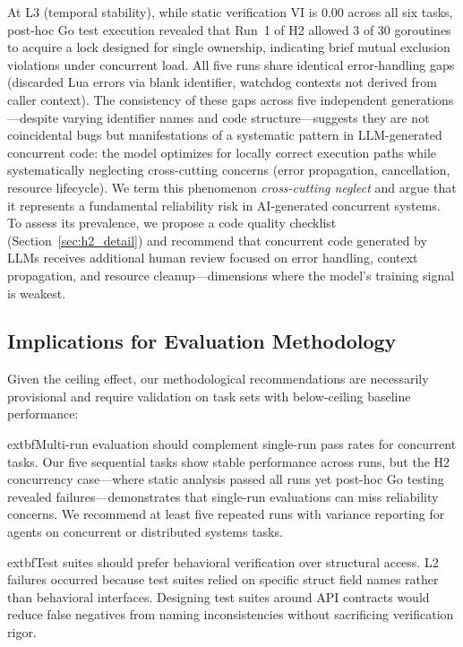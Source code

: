 \documentclass[conference]{IEEEtran}
\begin{document}
At L3 (temporal stability), while static verification VI is 0.00 across all six tasks, post-hoc Go test execution revealed that Run~1 of H2 allowed 3 of 30 goroutines to acquire a lock designed for single ownership, indicating brief mutual exclusion violations under concurrent load. All five runs share identical error-handling gaps (discarded Lua errors via blank identifier, watchdog contexts not derived from caller context). The consistency of these gaps across five independent generations---despite varying identifier names and code structure---suggests they are not coincidental bugs but manifestations of a systematic pattern in LLM-generated concurrent code: the model optimizes for locally correct execution paths while systematically neglecting cross-cutting concerns (error propagation, cancellation, resource lifecycle). We term this phenomenon \emph{cross-cutting neglect} and argue that it represents a fundamental reliability risk in AI-generated concurrent systems. To assess its prevalence, we propose a code quality checklist (Section~\ref{sec:h2_detail}) and recommend that concurrent code generated by LLMs receives additional human review focused on error handling, context propagation, and resource cleanup---dimensions where the model's training signal is weakest.

\subsection{Implications for Evaluation Methodology}

Given the ceiling effect, our methodological recommendations are necessarily provisional and require validation on task sets with below-ceiling baseline performance:

			extbf{Multi-run evaluation should complement single-run pass rates for concurrent tasks.} Our five sequential tasks show stable performance across runs, but the H2 concurrency case---where static analysis passed all runs yet post-hoc Go testing revealed failures---demonstrates that single-run evaluations can miss reliability concerns. We recommend at least five repeated runs with variance reporting for agents on concurrent or distributed systems tasks.

			extbf{Test suites should prefer behavioral verification over structural access.} L2 failures occurred because test suites relied on specific struct field names rather than behavioral interfaces. Designing test suites around API contracts would reduce false negatives from naming inconsistencies without sacrificing verification rigor.
\end{document}
